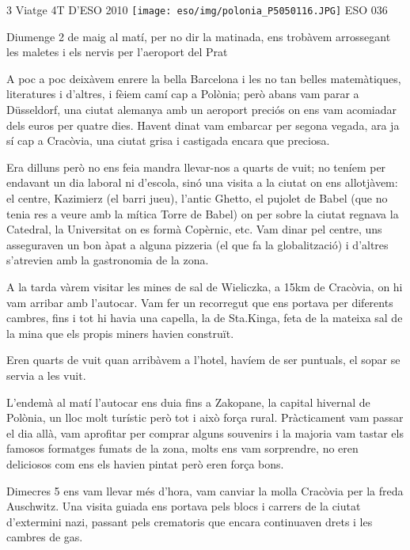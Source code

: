 \begin{news}
{3} %
{Viatge 4T D’ESO 2010}
{
\noindent\texttt{[image: eso/img/polonia\_P5050116.JPG]}
}
{ESO}
{036} %


Diumenge 2 de maig al matí, per no dir la matinada, ens trobàvem arrossegant les maletes i els nervis per l’aeroport del Prat

A poc a poc deixàvem enrere la bella Barcelona i les no tan belles matemàtiques, literatures i d’altres, i fèiem camí cap a Polònia; però abans vam parar a Düsseldorf, una ciutat alemanya amb un aeroport preciós on ens vam acomiadar dels euros per quatre dies. Havent dinat vam embarcar per segona vegada, ara ja sí cap a Cracòvia, una ciutat grisa i castigada encara que preciosa.

Era dilluns però no ens feia mandra llevar-nos a quarts de vuit; no teníem per endavant un dia laboral ni d’escola, sinó una visita a la ciutat on ens allotjàvem: el centre, Kazimierz (el barri jueu), l’antic Ghetto, el pujolet de Babel (que no tenia res a veure amb la mítica Torre de Babel) on per sobre la ciutat regnava la Catedral, la Universitat on es formà Copèrnic, etc. Vam dinar pel centre, uns asseguraven un bon àpat a alguna pizzeria (el que fa la globalització) i d’altres s’atrevien amb la gastronomia de la zona. 

A la tarda vàrem visitar les mines de sal de Wieliczka, a 15km de Cracòvia, on hi vam arribar amb l’autocar. Vam fer un recorregut que ens portava per diferents cambres, fins i tot hi havia una capella, la de Sta.Kinga, feta de la mateixa sal de la mina que els propis miners havien construït.

Eren quarts de vuit quan arribàvem a l’hotel, havíem de ser puntuals, el sopar se servia a les vuit. 

L’endemà al matí l’autocar ens duia fins a Zakopane, la capital hivernal de Polònia, un lloc molt turístic però tot i això força rural. Pràcticament vam passar el dia  allà, vam aprofitar per comprar alguns souvenirs i la majoria vam tastar els famosos formatges fumats de la zona, molts ens vam sorprendre, no eren deliciosos com ens els havien  pintat però eren força bons. 

Dimecres 5 ens vam llevar més d’hora, vam canviar la molla Cracòvia per la freda Auschwitz. Una visita guiada ens portava pels blocs i carrers de la ciutat d’extermini nazi, passant pels crematoris que encara continuaven drets i les cambres de gas. 


\end{news}
